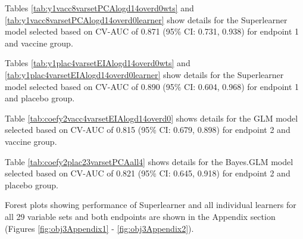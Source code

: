 \documentclass[11pt]{article}
\begin{document}
Tables \ref{tab:y1vacc8varsetPCAlogd14overd0wts} and \ref{tab:y1vacc8varsetPCAlogd14overd0learner} show details for the Superlearner model selected based on CV-AUC of 0.871 (95\% CI: 0.731, 0.938) for endpoint 1 and vaccine group.

Tables \ref{tab:y1plac4varsetEIAlogd14overd0wts} and \ref{tab:y1plac4varsetEIAlogd14overd0learner} show details for the Superlearner model selected based on CV-AUC of 0.890 (95\% CI: 0.604, 0.968) for endpoint 1 and placebo group.

Table \ref{tab:coefy2vacc4varsetEIAlogd14overd0} shows details for the GLM model selected based on CV-AUC of 0.815 (95\% CI: 0.679, 0.898) for endpoint 2 and vaccine group.

Table \ref{tab:coefy2plac23varsetPCAall4} shows details for the Bayes.GLM model selected based on CV-AUC of 0.821 (95\% CI: 0.645, 0.918) for endpoint 2 and placebo group.

Forest plots showing performance of Superlearner and all individual learners for all 29 variable sets and both endpoints are shown in the Appendix section (Figures \ref{fig:obj3Appendix1} - \ref{fig:obj3Appendix2}).

\clearpage
\end{document}
